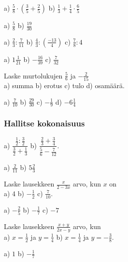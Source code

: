 \begin{tehtavasivu}
\begin{tehtava}
a) $\frac{5}{8}\cdot(\frac{3}{5}+\frac{2}{5})$ \qquad b) $\frac{1}{3}+\frac{1}{4}\cdot\frac{6}{5}$
\begin{vastaus}
a) $\frac{5}{8}$ \qquad b) $\frac{19}{30}$
\end{vastaus}
\end{tehtava}

\begin{tehtava}
a) $\frac{2}{3} : \frac{7}{11}$ \qquad b) $\frac{4}{3}:(\frac{-13}{4})$ \qquad c) $\frac{7}{8}:4$
\begin{vastaus}
a) $1\frac{1}{21}$ \qquad b) $-\frac{16}{39}$ \qquad c) $\frac{7}{32}$
\end{vastaus}
\end{tehtava}

\begin{tehtava}
Laske murtolukujen $\frac{5}{6}$ ja $-\frac{2}{15}$ \\ a) summa \qquad b) erotus \qquad c) tulo \qquad d) osamäärä.
\begin{vastaus}
a) $\frac{7}{10}$ \qquad b) $\frac{29}{30}$ \qquad c) $-\frac{1}{9}$ \qquad d) $-6\frac{1}{4}$
\end{vastaus}
\end{tehtava}

\subsubsection*{Hallitse kokonaisuus}

\begin{tehtava}
a) $\dfrac{\frac{1}{2}:\frac{3}{2}}{\frac{3}{2}+\frac{1}{3}}$ \qquad b) $\dfrac{\frac{2}{3}+\frac{3}{4}}{\frac{5}{6}-\frac{7}{12}}$.
\begin{vastaus}
a) $\frac{2}{11}$ \qquad b) $5\frac{2}{3}$
\end{vastaus}
\end{tehtava}

\begin{tehtava}
Laske lausekkeen $\frac{x}{2-3x}$ arvo, kun $x$ on \\ a) 4 \qquad b) $-\frac{1}{2}$ \qquad c) $\frac{7}{10}$.
\begin{vastaus}
a) $-\frac{2}{5}$ \qquad b) $-\frac{1}{7}$ \qquad c) $-7$
\end{vastaus}
\end{tehtava}

\begin{tehtava}
Laske lausekkeen $\frac{x+y}{2x-y}$ arvo, kun \\ a) $x=\frac{1}{2}$ ja $y= \frac{1}{4}$ \qquad b) $x=\frac{1}{4}$ ja $y= -\frac{3}{8}$.
\begin{vastaus}
a) $1$ \qquad b) $-\frac{1}{7}$
\end{vastaus}
\end{tehtava}


\end{tehtavasivu}
